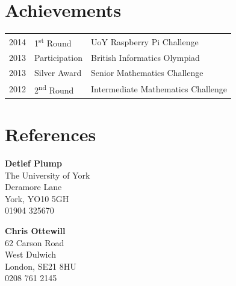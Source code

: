 \documentclass[a4paper]{cv}
\begin{document}
\begin{minipage}[t]{0.66\textwidth}

\section{Achievements} 

\begin{tabular}{rll}
2014	 & 1\textsuperscript{st} Round & UoY Raspberry Pi Challenge\\
2013 & Participation & British Informatics Olympiad \\
2013 & Silver Award & Senior Mathematics Challenge \\
2012 & 2\textsuperscript{nd} Round & Intermediate Mathematics Challenge \\
\end{tabular}

\sectionspace %


\section{References}

\begin{minipage}[t]{0.4\textwidth}
\textbf{Detlef Plump} \\
The University of York \\
Deramore Lane \\
York, YO10 5GH \\
01904 325670
\end{minipage}
\begin{minipage}[t]{0.4\textwidth}
\textbf{Chris Ottewill} \\
62 Carson Road \\
West Dulwich \\
London, 
SE21 8HU \\
0208 761 2145
\end{minipage}

\sectionspace %




\end{minipage} %

\vfill

{}
\end{document}

